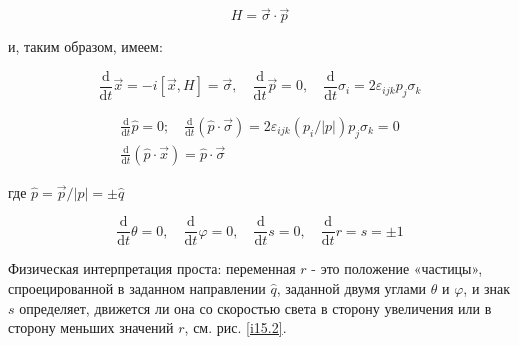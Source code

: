 \documentclass[main.tex]{subfiles}
\begin{document}
\begin{equation}\label{15.25}
	H=\vec{\sigma} \cdot \vec{p}
\end{equation}

и, таким образом, имеем:

\begin{equation}\label{15.26}
	\frac{\mathrm{d}}{\mathrm{d} t} \vec{x}=-i[\vec{x}, H]=\vec{\sigma}, \quad \frac{\mathrm{d}}{\mathrm{d} t} \vec{p}=0, \quad \frac{\mathrm{d}}{\mathrm{d} t} \sigma_{i}=2 \varepsilon_{i j k} p_{j} \sigma_{k}
\end{equation}

\begin{equation}\label{15.27}
	\begin{array}{l}{\frac{\mathrm{d}}{\mathrm{d} t} \hat{p}=0 ; \quad \frac{\mathrm{d}}{\mathrm{d} t}(\hat{p} \cdot \vec{\sigma})=2 \varepsilon_{i j k}\left(p_{i} /|p|\right) p_{j} \sigma_{k}=0} \\ {\frac{\mathrm{d}}{\mathrm{d} t}(\hat{p} \cdot \vec{x})=\hat{p} \cdot \vec{\sigma}}\end{array}
\end{equation}

где $\hat{p}=\vec{p} /|p|=\pm \hat{q}$

\begin{equation}\label{15.28}
	\frac{\mathrm{d}}{\mathrm{d} t} \theta=0, \quad \frac{\mathrm{d}}{\mathrm{d} t} \varphi=0, \quad \frac{\mathrm{d}}{\mathrm{d} t} s=0, \quad \frac{\mathrm{d}}{\mathrm{d} t} r=s=\pm 1
\end{equation}
                                   
Физическая интерпретация проста: переменная $r$ - это положение «частицы», спроецированной в заданном направлении $\hat q$, заданной двумя углами $\theta$ и $\varphi$, и знак $s$ определяет, движется ли она со скоростью света в сторону увеличения или в сторону меньших значений $r$, см. рис. \ref{i15.2}.
\end{document}
